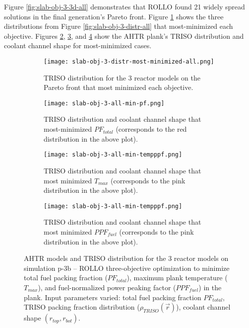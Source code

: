 Figure \ref{fig:slab-obj-3-3d-all} demonstrates that \gls{ROLLO} found 21 widely spread 
solutions in the final generation's Pareto front. 
Figure \ref{fig:slab-obj-3-distr-most-minimized-distr-all} shows the three distributions 
from Figure \ref{fig:slab-obj-3-distr-all} that most-minimized each objective. 
Figures \ref{fig:slab-obj-3-all-min-pf}, \ref{fig:slab-obj-3-all-min-temp}, and 
\ref{fig:slab-obj-3-all-min-ppf} show the \gls{AHTR} plank's TRISO distribution and 
coolant channel shape for most-minimized cases. 
\begin{figure}[htbp!]
    \begin{subfigure}{\textwidth}
        \texttt{[image: slab-obj-3-distr-most-minimized-all.png]}
        \caption{TRISO distribution for the 3 reactor models on the Pareto 
        front that most minimized each objective.}
        \label{fig:slab-obj-3-distr-most-minimized-distr-all}
    \end{subfigure}
    \begin{subfigure}{\textwidth}
        \texttt{[image: slab-obj-3-all-min-pf.png]}
        \caption{TRISO distribution and coolant channel shape that most-minimized 
        $PF_{total}$ (corresponds to the red distribution in the above plot).}
        \label{fig:slab-obj-3-all-min-pf}
    \end{subfigure}
    \begin{subfigure}{\textwidth}
        \texttt{[image: slab-obj-3-all-min-tempppf.png]}
        \caption{TRISO distribution and coolant channel shape that most minimized 
        $T_{max}$ (corresponds to the pink distribution in the above plot).}
        \label{fig:slab-obj-3-all-min-temp}
    \end{subfigure}
    \begin{subfigure}{\textwidth}
        \texttt{[image: slab-obj-3-all-min-tempppf.png]}
        \caption{TRISO distribution and coolant channel shape that most minimized 
        $PPF_{fuel}$ (corresponds to the pink distribution in the above plot).}
        \label{fig:slab-obj-3-all-min-ppf}
    \end{subfigure}
    \caption{AHTR models and TRISO distribution for the 3 reactor models on simulation 
    p-3b -- ROLLO three-objective optimization to minimize total 
    fuel packing fraction ($PF_{total}$), maximum plank temperature ($T_{max}$), and 
    fuel-normalized power peaking factor ($PPF_{fuel}$) in the plank. 
    Input parameters varied: total fuel packing fraction $PF_{total}$, 
    TRISO packing fraction distribution ($\rho_{TRISO}(\vec{r})$), 
    coolant channel shape $(r_{top}, r_{bot})$.}
    \label{fig:slab-obj-3-distr-most-minimized-all}
\end{figure}

